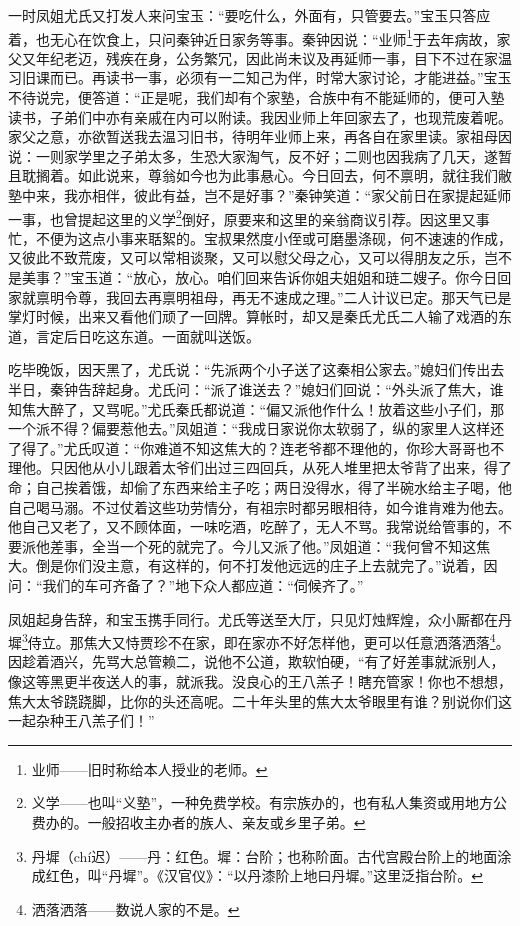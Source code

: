 \par 一时凤姐尤氏又打发人来问宝玉：“要吃什么，外面有，只管要去。”宝玉只答应着，也无心在饮食上，只问秦钟近日家务等事。秦钟因说：“业师\footnote{业师——旧时称给本人授业的老师。}于去年病故，家父又年纪老迈，残疾在身，公务繁冗，因此尚未议及再延师一事，目下不过在家温习旧课而已。再读书一事，必须有一二知己为伴，时常大家讨论，才能进益。”宝玉不待说完，便答道：“正是呢，我们却有个家塾，合族中有不能延师的，便可入塾读书，子弟们中亦有亲戚在内可以附读。我因业师上年回家去了，也现荒废着呢。家父之意，亦欲暂送我去温习旧书，待明年业师上来，再各自在家里读。家祖母因说：一则家学里之子弟太多，生恐大家淘气，反不好；二则也因我病了几天，遂暂且耽搁着。如此说来，尊翁如今也为此事悬心。今日回去，何不禀明，就往我们敝塾中来，我亦相伴，彼此有益，岂不是好事？”秦钟笑道：“家父前日在家提起延师一事，也曾提起这里的义学\footnote{义学——也叫“义塾”，一种免费学校。有宗族办的，也有私人集资或用地方公费办的。一般招收主办者的族人、亲友或乡里子弟。}倒好，原要来和这里的亲翁商议引荐。因这里又事忙，不便为这点小事来聒絮的。宝叔果然度小侄或可磨墨涤砚，何不速速的作成，又彼此不致荒废，又可以常相谈聚，又可以慰父母之心，又可以得朋友之乐，岂不是美事？”宝玉道：“放心，放心。咱们回来告诉你姐夫姐姐和琏二嫂子。你今日回家就禀明令尊，我回去再禀明祖母，再无不速成之理。”二人计议已定。那天气已是掌灯时候，出来又看他们顽了一回牌。算帐时，却又是秦氏尤氏二人输了戏酒的东道，言定后日吃这东道。一面就叫送饭。
\par 吃毕晚饭，因天黑了，尤氏说：“先派两个小子送了这秦相公家去。”媳妇们传出去半日，秦钟告辞起身。尤氏问：“派了谁送去？”媳妇们回说：“外头派了焦大，谁知焦大醉了，又骂呢。”尤氏秦氏都说道：“偏又派他作什么！放着这些小子们，那一个派不得？偏要惹他去。”凤姐道：“我成日家说你太软弱了，纵的家里人这样还了得了。”尤氏叹道：“你难道不知这焦大的？连老爷都不理他的，你珍大哥哥也不理他。只因他从小儿跟着太爷们出过三四回兵，从死人堆里把太爷背了出来，得了命；自己挨着饿，却偷了东西来给主子吃；两日没得水，得了半碗水给主子喝，他自己喝马溺。不过仗着这些功劳情分，有祖宗时都另眼相待，如今谁肯难为他去。他自己又老了，又不顾体面，一味吃酒，吃醉了，无人不骂。我常说给管事的，不要派他差事，全当一个死的就完了。今儿又派了他。”凤姐道：“我何曾不知这焦大。倒是你们没主意，有这样的，何不打发他远远的庄子上去就完了。”说着，因问：“我们的车可齐备了？”地下众人都应道：“伺候齐了。”
\par 凤姐起身告辞，和宝玉携手同行。尤氏等送至大厅，只见灯烛辉煌，众小厮都在丹墀\footnote{丹墀（chí迟）——丹：红色。墀：台阶；也称阶面。古代宫殿台阶上的地面涂成红色，叫“丹墀”。《汉官仪》：“以丹漆阶上地曰丹墀。”这里泛指台阶。}侍立。那焦大又恃贾珍不在家，即在家亦不好怎样他，更可以任意洒落洒落\footnote{洒落洒落——数说人家的不是。}。因趁着酒兴，先骂大总管赖二，说他不公道，欺软怕硬，“有了好差事就派别人，像这等黑更半夜送人的事，就派我。没良心的王八羔子！瞎充管家！你也不想想，焦大太爷跷跷脚，比你的头还高呢。二十年头里的焦大太爷眼里有谁？别说你们这一起杂种王八羔子们！”
